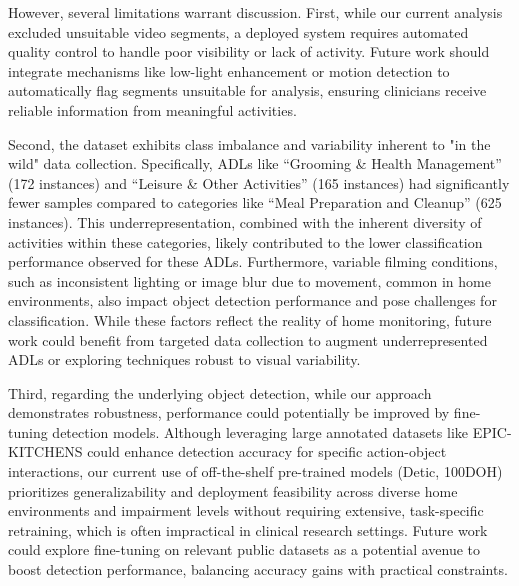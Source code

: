 \documentclass[journal,twoside,web]{ieeecolor}
\begin{document}
However, several limitations warrant discussion. First, while our current analysis excluded unsuitable video segments, a deployed system requires automated quality control to handle poor visibility or lack of activity. Future work should integrate mechanisms like low-light enhancement \cite{Singh2019-nd, Peng2022-lc} or motion detection \cite{Shruthi2017-ie} to automatically flag segments unsuitable for analysis, ensuring clinicians receive reliable information from meaningful activities.

Second, the dataset exhibits class imbalance and variability inherent to "in the wild" data collection. Specifically, ADLs like “Grooming \& Health Management” (172 instances) and “Leisure \& Other Activities” (165 instances) had significantly fewer samples compared to categories like “Meal Preparation and Cleanup” (625 instances). This underrepresentation, combined with the inherent diversity of activities within these categories, likely contributed to the lower classification performance observed for these ADLs. Furthermore, variable filming conditions, such as inconsistent lighting or image blur due to movement, common in home environments, also impact object detection performance and pose challenges for classification. While these factors reflect the reality of home monitoring, future work could benefit from targeted data collection to augment underrepresented ADLs or exploring techniques robust to visual variability.

Third, regarding the underlying object detection, while our approach demonstrates robustness, performance could potentially be improved by fine-tuning detection models. Although leveraging large annotated datasets like EPIC-KITCHENS \cite{Damen2020-ep} could enhance detection accuracy for specific action-object interactions, our current use of off-the-shelf pre-trained models (Detic, 100DOH) prioritizes generalizability and deployment feasibility across diverse home environments and impairment levels without requiring extensive, task-specific retraining, which is often impractical in clinical research settings. Future work could explore fine-tuning on relevant public datasets as a potential avenue to boost detection performance, balancing accuracy gains with practical constraints.
\end{document}
